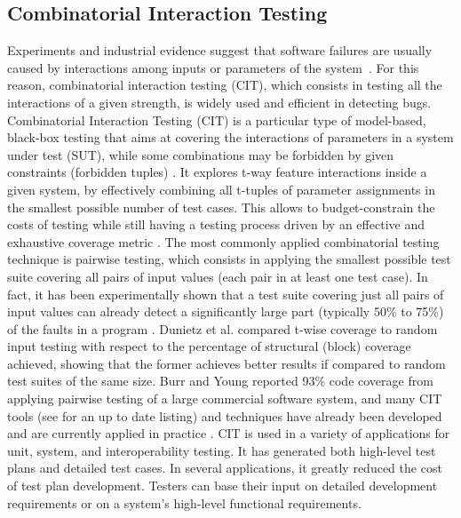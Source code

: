 \subsection{Combinatorial Interaction Testing}\label{sec:cit}
Experiments and industrial evidence suggest that software failures are usually caused by interactions among inputs or parameters of the system~\cite{Kuhn02}. For this reason, combinatorial interaction testing (CIT), which consists in testing all the interactions of a given strength, is widely used and efficient in detecting bugs. 
Combinatorial Interaction Testing (CIT) is a particular type of model-based, black-box testing that aims at covering the interactions of parameters in a system under test (SUT), while some combinations may be forbidden by given constraints (forbidden tuples) \cite{yamada_greedy_2016}.
It explores t-way feature interactions inside a given system, by effectively combining all t-tuples of parameter assignments in the smallest possible number of test cases.
This allows to budget-constrain the costs of testing while still having a testing process driven by an effective and exhaustive coverage metric \cite{AETG,KuhnTSE04}. 
The most commonly applied combinatorial testing technique is pairwise testing, which consists in applying the smallest possible test suite covering all pairs of input values (each pair in at least one test case). 
In fact, it has been experimentally shown that a test suite covering just all pairs of input values can already detect a significantly large part (typically 50\% to 75\%) of the faults in a program \cite{Dalal:ICSE99, IPO}.
Dunietz et al. \cite{Dunietz:ICSE97} compared t-wise coverage to random input testing with respect to the percentage of structural (block) coverage achieved, showing that the former achieves better results if compared to random test suites of the same size. 
Burr and Young \cite{burr98} reported 93\% code coverage from applying pairwise testing of a large commercial software system, and many CIT tools (see \cite{pairwise} for an up to date listing) and techniques have already been developed \cite{Dalal1998a,GrindalSTVR05,KuhnTSE04} and are currently applied in practice \cite{Brownlie1992a,Kuhn02,Smith}. 
CIT is used in a variety of applications for unit, system, and interoperability testing. 
It has generated both high-level test plans and detailed test cases. In several applications, it greatly reduced the cost of test plan development. Testers can base their input on detailed development requirements or on a system's high-level functional requirements.

